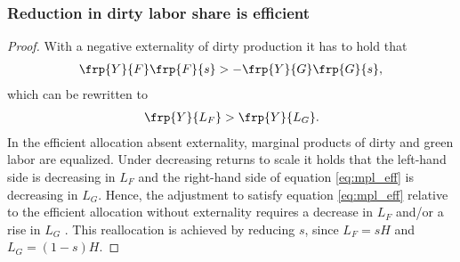 \subsubsection{Reduction in dirty labor share is efficient}
\begin{proof}
	With a negative externality of dirty production it has to hold that 
	\begin{align}
	\frp{Y}{F}\frp{F}{s}>-\frp{Y}{G}\frp{G}{s},
	\end{align}
	which can be rewritten to 
	\begin{align}\label{eq:mpl_eff}
	\frp{Y}{L_F}>\frp{Y}{L_G}. 
	\end{align}
	In the efficient allocation absent externality, marginal products of dirty and green labor are equalized. 
	Under decreasing returns to scale it holds that the left-hand side is decreasing in $L_F$ and the right-hand side of equation \ref{eq:mpl_eff} is decreasing in $L_G$. Hence, the adjustment to satisfy equation \ref{eq:mpl_eff} relative to the efficient allocation without externality requires a decrease in $L_F$ and/or a rise in $L_G$  .
	This reallocation is achieved by reducing $s$, since $L_F=sH$ and $L_G=(1-s)H$.	
\end{proof}


